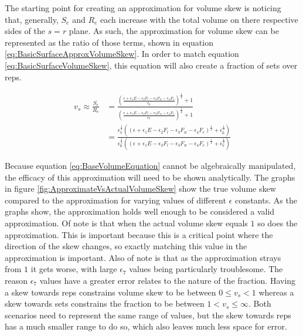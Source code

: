 The starting point for creating an approximation for volume skew is noticing that, generally, $S_e$ and $R_e$ each increase with the total volume on there respective sides of the $s=r$ plane. As such, the approximation for volume skew can be represented as the ratio of those terms, shown in equation \ref{eq:BasicSurfaceApproxVolumeSkew}. In order to match equation \ref{eq:BasicSurfaceVolumeSkew}, this equation will also create a fraction of sets over reps.

\begin{equation}
	\label{eq:BasicSurfaceApproxVolumeSkew}
	\begin{split}
		v_s \approx \frac{S_e}{R_e} & =\frac{
			\left(
				\frac{
					\epsilon+
					\epsilon_1E-
					\epsilon_2F_l-
					\epsilon_3F_w-
					\epsilon_4F_e
				}{
					\epsilon_6
				}
			\right)^{\frac{1}{2}}+1
		}{
			\left(
				\frac{
					\epsilon+
					\epsilon_1E-
					\epsilon_2F_l-
					\epsilon_3F_w-
					\epsilon_4F_e
				}{
					\epsilon_7
				}
			\right)^{\frac{1}{2}}+1
		} \\
		& = \frac{
			\epsilon_7^{\frac{1}{2}} \left(
				\left(
					\epsilon+
					\epsilon_1E-
					\epsilon_2F_l-
					\epsilon_3F_w-
					\epsilon_4F_e
				\right)^{\frac{1}{2}}+
				\epsilon_6^{\frac{1}{2}}
			\right)		
		}{
			\epsilon_6^{\frac{1}{2}} \left(
				\left(
					\epsilon+
					\epsilon_1E-
					\epsilon_2F_l-
					\epsilon_3F_w-
					\epsilon_4F_e
				\right)^{\frac{1}{2}}+
				\epsilon_7^{\frac{1}{2}}
			\right)		
		}
	\end{split}
\end{equation}

Because equation \ref{eq:BaseVolumeEquation} cannot be algebraically manipulated, the efficacy of this approximation will need to be shown analytically. The graphs in figure \ref{fig:ApproximateVsActualVolumeSkew} show the true volume skew compared to the approximation for varying values of different $\epsilon$ constants. As the graphs show, the approximation holds well enough to be considered a valid approximation. Of note is that when the actual volume skew equals $1$ so does the approximation. This is important because this is a critical point where the direction of the skew changes, so exactly matching this value in the approximation is important. Also of note is that as the approximation strays from $1$ it gets worse, with large $\epsilon_7$ values being particularly troublesome. The reason $\epsilon_7$ values have a greater error relates to the nature of the fraction. Having a skew towards reps constrains volume skew to be between $0\le v_s<1$ whereas a skew towards sets constrains the fraction to be between $1<v_s\le \infty$. Both scenarios need to represent the same range of values, but the skew towards reps has a much smaller range to do so, which also leaves much less space for error.


